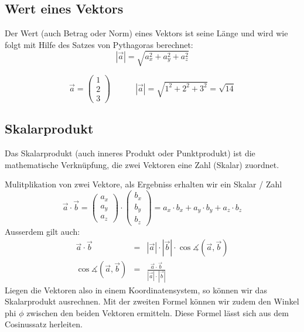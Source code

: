 \subsection{Wert eines Vektors}
Der Wert (auch Betrag oder Norm) eines Vektors ist seine Länge und wird wie folgt mit Hilfe des Satzes von Pythagoras berechnet:
\begin{equation*}
|\vec{a}| = \sqrt{a_{x}^{2} + a_{y}^{2} + a_{z}^{2}}
\end{equation*}
\begin{myexample}
\begin{equation*}
\vec{a} = \begin{pmatrix}1\\2\\3\end{pmatrix} \quad\quad\quad |\vec{a}| = \sqrt{1^2 + 2^2 + 3^2} = \sqrt{14}
\end{equation*}
\end{myexample}
\subsection{Skalarprodukt}
\begin{mydef}Das Skalarprodukt (auch inneres Produkt oder Punktprodukt) ist die mathematische Verknüpfung, die zwei Vektoren eine Zahl (Skalar) zuordnet.\end{mydef}
Mulitplikation von zwei Vektore, als Ergebniss erhalten wir ein Skalar / Zahl
\begin{equation*}
\vec{a} \cdot \vec{b} = \begin{pmatrix}a_x\\a_y\\a_z\end{pmatrix} \cdot \begin{pmatrix}b_x\\b_y\\b_z\end{pmatrix} = a_x \cdot b_x + a_y \cdot b_y + a_z \cdot b_z
\end{equation*}
Ausserdem gilt auch:
\begin{eqnarray*}
\vec{a} \cdot \vec{b} & =& |\vec{a}| \cdot |\vec{b}| \cdot \cos \measuredangle(\vec{a}, \vec{b})\\
\cos \measuredangle(\vec{a}, \vec{b}) &=& \frac{\vec{a} \cdot \vec{b} }{|\vec{a}| \cdot |\vec{b}|}
\end{eqnarray*}
Liegen die Vektoren also in einem Koordinatensystem, so können wir das Skalarprodukt ausrechnen. Mit der zweiten Formel können wir zudem den Winkel phi $\phi$ zwischen den beiden Vektoren ermitteln. Diese Formel lässt sich aus dem Cosinussatz herleiten.
